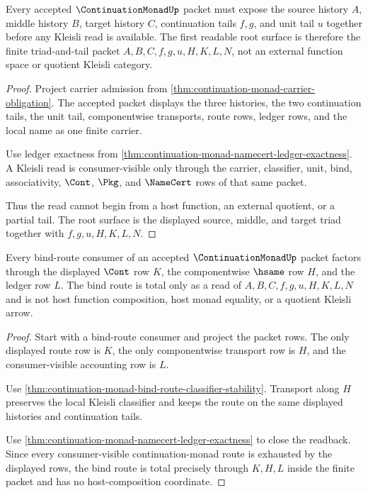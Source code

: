 \begin{theorem}
\label{thm:continuation-monad-root-unblock-source-triad}
Every accepted $\ContinuationMonadUp$ packet must expose the source history $A$, middle history $B$, target history $C$, continuation tails $f,g$, and unit tail $u$ together before any Kleisli read is available. The first readable root surface is therefore the finite triad-and-tail packet $A,B,C,f,g,u,H,K,L,N$, not an external function space or quotient Kleisli category.
\end{theorem}
\begin{proof}
Project carrier admission from \autoref{thm:continuation-monad-carrier-obligation}. The accepted packet displays the three histories, the two continuation tails, the unit tail, componentwise transports, route rows, ledger rows, and the local name as one finite carrier.

Use ledger exactness from \autoref{thm:continuation-monad-namecert-ledger-exactness}. A Kleisli read is consumer-visible only through the carrier, classifier, unit, bind, associativity, $\Cont$, $\Pkg$, and $\NameCert$ rows of that same packet.

Thus the read cannot begin from a host function, an external quotient, or a partial tail. The root surface is the displayed source, middle, and target triad together with $f,g,u,H,K,L,N$.
\end{proof}

\begin{theorem}
\label{thm:continuation-monad-root-unblock-bind-totality}
Every bind-route consumer of an accepted $\ContinuationMonadUp$ packet factors through the displayed $\Cont$ row $K$, the componentwise $\hsame$ row $H$, and the ledger row $L$. The bind route is total only as a read of $A,B,C,f,g,u,H,K,L,N$ and is not host function composition, host monad equality, or a quotient Kleisli arrow.
\end{theorem}
\begin{proof}
Start with a bind-route consumer and project the packet rows. The only displayed route row is $K$, the only componentwise transport row is $H$, and the consumer-visible accounting row is $L$.

Use \autoref{thm:continuation-monad-bind-route-classifier-stability}. Transport along $H$ preserves the local Kleisli classifier and keeps the route on the same displayed histories and continuation tails.

Use \autoref{thm:continuation-monad-namecert-ledger-exactness} to close the readback. Since every consumer-visible continuation-monad route is exhausted by the displayed rows, the bind route is total precisely through $K,H,L$ inside the finite packet and has no host-composition coordinate.
\end{proof}

